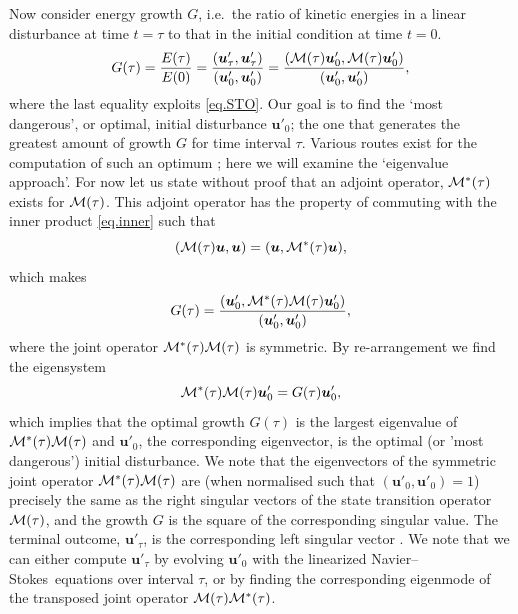 \documentclass[11pt,a4paper]{report}
\newcommand\NavSto{Navier--Stokes}
\newcommand\LNS{linearized \NavSto}
\newcommand{\ie}{i.e.\ }
\newcommand\upert{{\bm{u}'}}
\newcommand\uvec{\bm{u}}
\newcommand\Mop{{\cal M}}
\newcommand\Madj{{\cal M^*}}
\begin{document}
Now consider energy growth $G$, \ie the ratio of kinetic energies in a
linear disturbance at time $t=\tau$ to that in the initial condition
at time $t=0$.
\begin{equation}
G(\tau)=\frac{E(\tau)}{E(0)}=
\frac{(\bm{u}'_\tau,\bm{u}'_\tau)}{(\bm{u}'_0,\bm{u}'_0)}=
\frac{(\Mop(\tau)\bm{u}'_0,\Mop(\tau)\bm{u}'_0)}{(\bm{u}'_0,\bm{u}'_0)},
\end{equation}
where the last equality exploits \eqref{eq.STO}.  Our goal is to find
the `most dangerous', or optimal, initial disturbance $\uvec'_0$; the
one that generates the greatest amount of growth $G$ for time interval
$\tau$.  Various routes exist for the computation of such an optimum
\citep{bms12,mbs13}; here we will examine the `eigenvalue approach'.
For now let us state without proof that an adjoint operator,
$\Madj(\tau)$ exists for $\Mop(\tau)$.  This adjoint operator has the
property of commuting with the inner product \eqref{eq.inner} such
that
\begin{equation}
(\Mop(\tau)\uvec,\uvec)=(\uvec,\Madj(\tau)\uvec),
\label{eq.commute1}
\end{equation}
which makes
\begin{equation}
G(\tau) = \frac{(\bm{u}'_0,\Madj(\tau)\Mop(\tau)\bm{u}'_0)}
{(\bm{u}'_0,\bm{u}'_0)},
\end{equation}
where the joint operator $\Madj(\tau)\Mop(\tau)$ is symmetric.  By
re-arrangement we find the eigensystem
\begin{equation}
\Madj(\tau)\Mop(\tau)\bm{u}'_0 = G(\tau)\uvec'_0,
\label{eq.growevp}
\end{equation}
which implies that the optimal growth $G(\tau)$ is the largest
eigenvalue of $\Madj(\tau)\Mop(\tau)$ and $\uvec'_0$, the
corresponding eigenvector, is the optimal (or 'most dangerous')
initial disturbance.  We note that the eigenvectors of the symmetric
joint operator $\Madj(\tau)\Mop(\tau)$ are (when normalised such that
$(\upert_0,\upert_0)=1$) precisely the same as the right singular
vectors of the state transition operator $\Mop(\tau)$, and the growth
$G$ is the square of the corresponding singular value.  The terminal
outcome, $\upert_\tau$, is the corresponding left singular vector
\citep[see \S\,1.2,][]{bbs08b}.  We note that we can either compute
$\upert_\tau$ by evolving $\upert_0$ with the \LNS\ equations over
interval $\tau$, or by finding the corresponding eigenmode of the
transposed joint operator $\Mop(\tau)\Madj(\tau)$.

\end{document}
